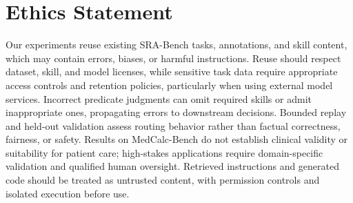 \section*{Ethics Statement}

Our experiments reuse existing SRA-Bench tasks, annotations, and skill content, which may contain errors, biases, or harmful instructions. Reuse should respect dataset, skill, and model licenses, while sensitive task data require appropriate access controls and retention policies, particularly when using external model services. Incorrect predicate judgments can omit required skills or admit inappropriate ones, propagating errors to downstream decisions. Bounded replay and held-out validation assess routing behavior rather than factual correctness, fairness, or safety. Results on MedCalc-Bench do not establish clinical validity or suitability for patient care; high-stakes applications require domain-specific validation and qualified human oversight. Retrieved instructions and generated code should be treated as untrusted content, with permission controls and isolated execution before use.
